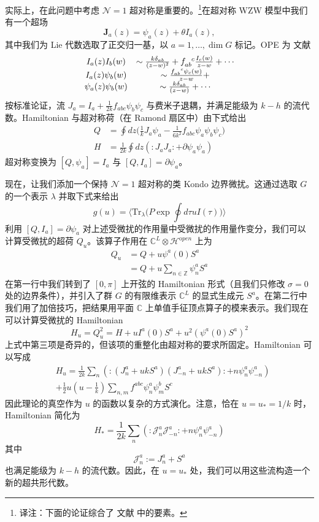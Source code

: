 \documentclass[11pt,a4paper]{ctexart}
\newcommand{\TN}[1]{\footnote{译注：#1}}
\begin{document}
实际上，在此问题中考虑 \({\mathcal N}=1\) 超对称是重要的。\TN{下面的论证综合了 文献 中的要素。}在超对称 WZW 模型中我们有一个超场 \[{\mathbf J}_a(z) = \psi_a(z) + \theta I_a(z),\] 其中我们为 Lie 代数选取了正交归一基，以 \(a=1, \dots, \dim G\) 标记。OPE 为 文献 \[\begin{matrix} I_a(z) I_b(w) & \sim {k
\delta_{ab}\over (z-w)^2} +  f_{ab}^{~~c} \frac{I_c(w)}{z-w}
+\cdots \\ I_a(z) \psi_b(w) & \sim {f_{ab}^{~~c}
\psi_c(w)\over z-w} + \\ \psi_a(z) \psi_b(w) & \sim {k
\delta_{ab}\over (z-w)} +\cdots \end{matrix}\] 按标准论证，流 \(J_a = I_a + \frac{1}{2k} f_{abc} \psi_b \psi_c\) 与费米子退耦，并满足能级为 \(k-h\) 的流代数。Hamiltonian 与超对称荷（在 Ramond 扇区中）由下式给出 \[\begin{matrix}
Q & = \oint dz  \biggl( \frac{1}{k} J_a \psi_a - \frac{1}{6k^2} f_{abc} \psi_a \psi_b \psi_c \biggr) \\
H & =\frac{1}{2k} \oint dz  \left( :J_a J_a: +  \partial \psi_a \psi_a \right) \end{matrix}\] 超对称变换为 \([Q,\psi_a] = I_a\) 与 \([Q, I_a] = \partial \psi_a\)。

现在，让我们添加一个保持 \({\mathcal N}=1\) 超对称的类 Kondo 边界微扰。这通过选取 \(G\) 的一个表示 \(\lambda\) 并取下式来给出 \[g(u) = \langle {\mathrm{Tr}}_{\lambda}\biggl( P \exp \oint d\tau u I(\tau) \biggr)\rangle\] 利用 \([Q, I_a] = \partial \psi_a\) 对上述受微扰的作用量中受微扰的作用量作变分，我们可以计算受微扰的超荷 \(Q_u\)。该算子作用在 \(\mathbb{C}^L \otimes {\mathcal H}^{\mathrm open}\) 上为 \[\begin{matrix}
Q_u & = Q+ u \psi^a(0)  S^a\\
&  = Q+ u \sum_{n\in \mathbb{Z}}  \psi^a_n S^a \end{matrix}\] 在第一行中我们转到了 \([0,\pi]\) 上开弦的 Hamiltonian 形式（且我们只修改 \(\sigma=0\) 处的边界条件），并引入了群 \(G\) 的有限维表示 \(\mathbb{C}^L\) 的显式生成元 \(S^a\)。在第二行中我们用了加倍技巧，把结果用平面 \(\mathbb{C}\) 上单值手征顶点算子的模来表示。我们现在可以计算受微扰的 Hamiltonian \[H_u = Q_u^2 = H + u I^a(0)S^a + u^2 (\psi^a(0) S^a)^2\] 上式中第三项是奇异的，但该项的重整化由超对称的要求所固定。Hamiltonian 可以写成 \[\begin{matrix}
& H_u= \frac{1}{2k} \sum_n \left( : (J^a_n + uk S^a)(J^a_{-n} + uk S^a) : + n \psi^a_n \psi^a_{-n} \right)  \\
& + \frac{1}{2} u (u-\frac{1}{k}) \sum_{n,m} f^{abc} \psi_n^a \psi_m^b S^c \end{matrix}\] 因此理论的真空作为 \(u\) 的函数以复杂的方式演化。注意，恰在 \(u=u_*=1/k\) 时，Hamiltonian 简化为 \[H_* = \frac{1}{2k} \sum_n \left( : {\mathcal J}^a_n {\mathcal J}^a_{-n} : + n \psi^a_n \psi^a_{-n} \right)\] 其中 \[{\mathcal J}^a_n  := J^a_n + S^a\] 也满足能级为 \(k-h\) 的流代数。因此，在 \(u=u_*\) 处，我们可以用这些流构造一个新的超共形代数。
\end{document}
